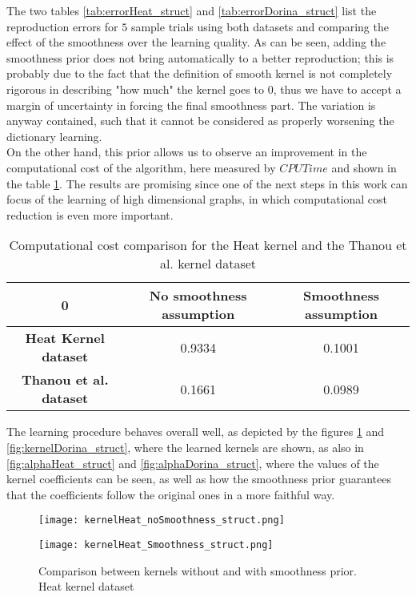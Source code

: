 The two tables \ref{tab:errorHeat_struct} and \ref{tab:errorDorina_struct} list the reproduction errors for $5$ sample trials using both datasets and comparing the effect of the smoothness over the learning quality. As can be seen, adding the smoothness prior does not bring automatically to a better reproduction; this is probably due to the fact that the definition of smooth kernel is not completely rigorous in describing "how much" the kernel goes to $0$, thus we have to accept a margin of uncertainty in forcing the final smoothness part. The variation is anyway contained, such that it cannot be considered as properly worsening the dictionary learning.\\

On the other hand, this prior allows us to observe an improvement in the computational cost of the algorithm, here measured by $CPUTime$ and shown in the table \ref{tab:CPUTime_struct}. The results are promising since one of the next steps in this work can focus of the learning of high dimensional graphs, in which computational cost reduction is even more important.

\begin{table}[htbp]
  \centering
  \begin{tabular}{c|c|c}
    0 &
    \multicolumn{1}{c}{\textbf{No smoothness assumption}} &
    \multicolumn{1}{|c}{\textbf{Smoothness assumption}}\\
    \hline
    \textbf{Heat Kernel dataset} & 0.9334 & 0.1001\\
    \textbf{Thanou et al. dataset} & 0.1661 & 0.0989 \\
  \end{tabular}
  \caption{Computational cost comparison for the Heat kernel and the Thanou et al. kernel dataset}
  \label{tab:CPUTime_struct}
\end{table}

The learning procedure behaves overall well, as depicted by the figures \ref{fig:kernelHeat_struct} and \ref{fig:kernelDorina_struct}, where the learned kernels are shown, as also in \autoref{fig:alphaHeat_struct} and \autoref{fig:alphaDorina_struct}, where the values of the kernel coefficients can be seen, as well as how the smoothness prior guarantees that the coefficients follow the original ones in a more faithful way.

\begin{figure}
  \begin{minipage}[c]{.5\textwidth}
    \centering
    \texttt{[image: kernelHeat\_noSmoothness\_struct.png]}
  \end{minipage}
  \begin{minipage}[c]{.5\textwidth}
    \centering
    \texttt{[image: kernelHeat\_Smoothness\_struct.png]}
  \end{minipage}
  \caption{Comparison between kernels without and with smoothness prior. Heat kernel dataset}
  \label{fig:kernelHeat_struct}
\end{figure}

